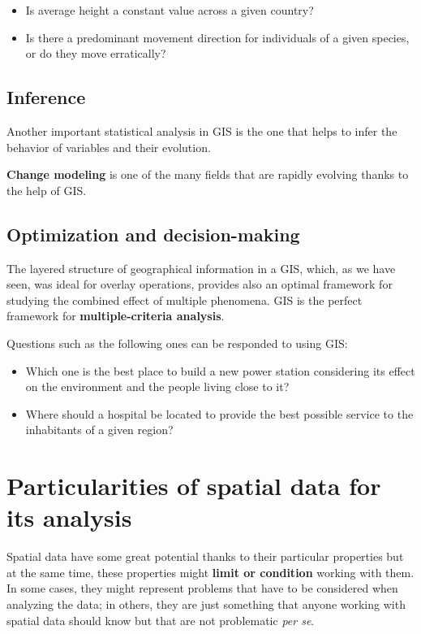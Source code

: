\begin{itemize}
\item Is average height a constant value across a given country?
\item Is there a predominant movement direction for individuals of a given species, or do they move erratically?
\end{itemize}

\subsection{Inference}

Another important statistical analysis in GIS is the one that helps to infer the behavior of variables and their evolution.

\textbf{Change modeling} is one of the many fields that are rapidly evolving thanks to the help of GIS.

\subsection{Optimization and decision-making}

The layered structure of geographical information in a GIS, which, as we have seen, was ideal for overlay operations, provides also an optimal framework for studying the combined effect of multiple phenomena. GIS is the perfect framework for \textbf{multiple-criteria analysis}.

Questions such as the following ones can be responded to using GIS:

\begin{itemize}
\item Which one is the best place to build a new power station considering its effect on the environment and the people living close to it?
\item Where should a hospital be located to provide the best possible service to the inhabitants of a given region?
\end{itemize}


\section{Particularities of spatial data for its analysis}

Spatial data have some great potential thanks to their particular properties but at the same time, these properties might \textbf{limit or condition} working with them. In some cases, they might represent problems that have to be considered when analyzing the data; in others, they are just something that anyone working with spatial data should know but that are not problematic \emph{per se}.


